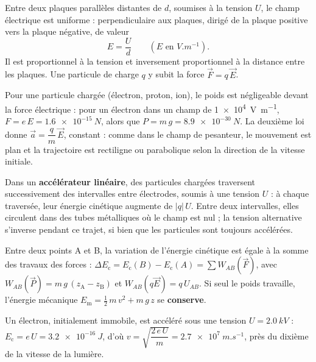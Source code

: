 \begin{propriete}
Entre deux plaques parallèles distantes de $d$, soumises à la tension $U$, le champ électrique est uniforme :
perpendiculaire aux plaques, dirigé de la plaque positive vers la plaque négative, de valeur
\[E=\frac{U}{d}\qquad(E\text{ en }\unit{V.m^{-1}}).\]
Il est proportionnel à la tension et inversement proportionnel à la distance entre les plaques. Une particule de
charge $q$ y subit la force $\vec{F}=q\,\vec{E}$.
\end{propriete}
\begin{propriete}
Pour une particule chargée (électron, proton, ion), le poids est négligeable devant la force électrique : pour un
électron dans un champ de \qty{1e4}{V.m^{-1}}, $F=e\,E=\qty{1,6e-15}{N}$, alors que $P=m\,g=\qty{8,9e-30}{N}$. La
deuxième loi donne $\vec{a}=\dfrac{q}{m}\,\vec{E}$, constant : comme dans le champ de pesanteur, le mouvement est plan
et la trajectoire est rectiligne ou parabolique selon la direction de la vitesse initiale.
\end{propriete}
\begin{definition}
Dans un \textbf{accélérateur linéaire}, des particules chargées traversent successivement des intervalles entre
électrodes, soumis à une tension $U$ : à chaque traversée, leur énergie cinétique augmente de $|q|\,U$. Entre deux
intervalles, elles circulent dans des tubes métalliques où le champ est nul ; la tension alternative s'inverse pendant
ce trajet, si bien que les particules sont toujours accélérées.
\end{definition}
\begin{propriete}
Entre deux points A et B, la variation de l'énergie cinétique est égale à la somme des travaux des forces :
$\Delta E_\mathrm{c}=E_\mathrm{c}(B)-E_\mathrm{c}(A)=\sum W_{AB}(\vec{F})$, avec $W_{AB}(\vec{P})=m\,g\,(z_\mathrm{A}-z_\mathrm{B})$ et
$W_{AB}(q\vec{E})=q\,U_{AB}$. Si seul le poids travaille, l'énergie mécanique $E_\mathrm{m}=\frac12\,m\,v^2+m\,g\,z$ se
\textbf{conserve}.
\end{propriete}
\begin{exemple}
Un électron, initialement immobile, est accéléré sous une tension $U=\qty{2,0}{kV}$ : $E_\mathrm{c}=e\,U=\qty{3,2e-16}{J}$,
d'où $v=\sqrt{\dfrac{2\,e\,U}{m}}=\qty{2,7e7}{m.s^{-1}}$, près du dixième de la vitesse de la lumière.
\end{exemple}
